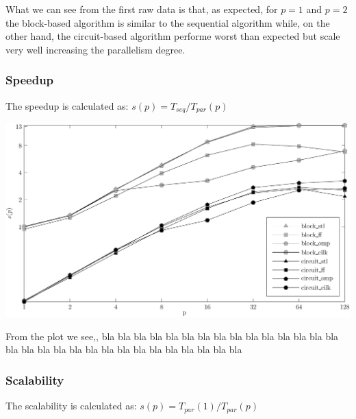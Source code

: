 \documentclass{article}
\begin{document}
\smallskip

What we can see from the first raw data is that, as expected, for $p = 1$ and $p = 2$ the block-based algorithm is similar to the sequential algorithm while, on the other hand, the circuit-based algorithm performe worst than expected but scale very well increasing the parallelism degree.

\subsubsection{Speedup}

The speedup is calculated as: $s(p) = T_{seq} / T_{par}(p)$

\begin{center}
\begin{minipage}{0.9\linewidth}
\includegraphics[width=\linewidth]{img/speedup}
\end{minipage}
\end{center}

From the plot we see,, bla bla bla bla bla bla bla bla bla bla bla bla bla bla bla bla bla bla bla bla bla bla bla bla bla bla bla bla bla bla

\subsubsection{Scalability}

The scalability is calculated as: $s(p) = T_{par}(1) / T_{par}(p)$
\end{document}
